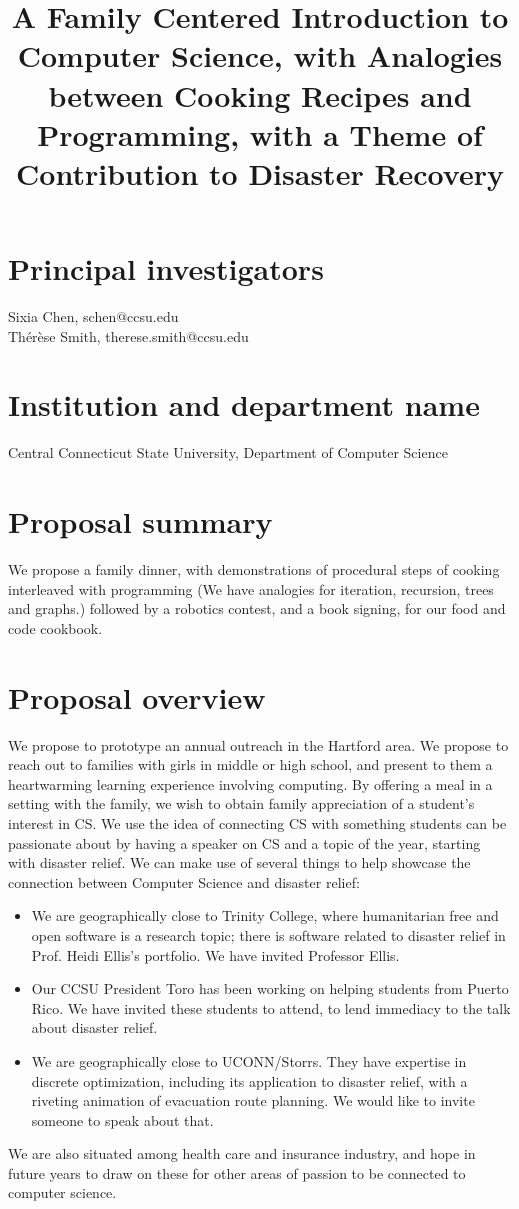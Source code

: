 \documentclass[]{article}
\title{A Family Centered Introduction to Computer Science, with Analogies between Cooking Recipes  
	and Programming, with a Theme of Contribution to Disaster Recovery}
\author{}
\begin{document}
	
	\maketitle
	
	
	
	
	
	\section{Principal investigators}
	Sixia Chen, schen@ccsu.edu\\
	Th\'er\`ese Smith, therese.smith@ccsu.edu
	
	\section{Institution and department name}
	Central Connecticut State University, Department of Computer Science
	
	\section{Proposal summary}
	We propose a family dinner, with demonstrations of procedural steps of cooking interleaved with programming 
	(We have analogies for iteration, recursion, trees and graphs.) followed by a robotics contest, and a book signing, 
	for our food and code cookbook.
	
	
	\section{Proposal overview}
	We propose to prototype an annual outreach in the Hartford area.
	We propose to reach out to families with girls in middle or high school, and present to them a heartwarming learning experience involving computing. By offering a meal in a setting with the family, we wish to obtain family appreciation of a student's interest in
	CS.
	We use the idea of connecting CS with something students can be passionate about by having a speaker on CS and a topic of the 
	year, starting with disaster relief. 
	We can make use of several things to help showcase the connection between Computer Science and disaster relief:
	\begin{itemize}
		\item We are geographically close to Trinity College, where humanitarian free and open software is a research topic; there is 
		software related to disaster relief in Prof. Heidi Ellis's portfolio. We have invited Professor Ellis. 
		\item Our CCSU President Toro has been working on helping students from Puerto Rico. We have invited these students to attend, 
		to lend immediacy to the talk about disaster relief.  
		\item We are geographically close to UCONN/Storrs. They have expertise in discrete optimization, including its application to 
		disaster relief, with a riveting animation of evacuation route planning. We would like to invite someone to speak about that.
	\end{itemize}
	We are also situated among health care and insurance industry, and hope in future years to draw on these for other areas of 
	passion to be connected to computer science.
	
\end{document}
